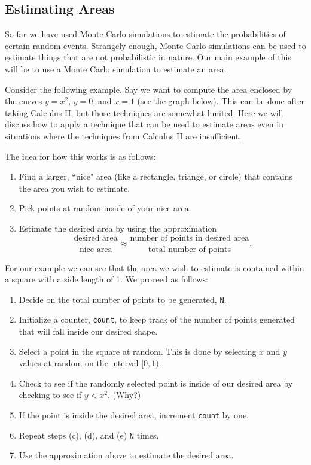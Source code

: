 \documentclass{ximera}
\begin{document}
\subsection{Estimating Areas}

So far we have used Monte Carlo simulations to estimate the probabilities of certain random events. Strangely enough, Monte Carlo simulations can be used to estimate things that are not probabilistic in nature. Our main example of this will be to use a Monte Carlo simulation to estimate an area.

Consider the following example. Say we want to compute the area enclosed by the curves $y = x^2$, $y=0$, and $x=1$ (see the graph below). This can be done after taking Calculus II, but those techniques are somewhat limited. Here we will discuss how to apply a technique that can be used to estimate areas even in situations where the techniques from Calculus II are insufficient.


The idea for how this works is as follows:

\begin{enumerate}
	\item Find a larger, ``nice" area (like a rectangle, triange, or circle) that contains the area you wish to estimate.
	\item Pick points at random inside of your nice area.
	\item Estimate the desired area by using the approximation $$\frac{\text{desired area}}{\text{nice area}}\approx\frac{\text{number of points in desired area}}{\text{total number of points}}.$$
\end{enumerate}

For our example we can see that the area we wish to estimate is contained within a square with a side length of 1. We proceed as follows:

\begin{enumerate}
	\item Decide on the total number of points to be generated, \verb|N|.
	\item Initialize a counter, \verb|count|, to keep track of the number of points generated that will fall inside our desired shape.
	\item Select a point in the square at random. This is done by selecting $x$ and $y$ values at random on the interval $[0,1)$.
	\item Check to see if the randomly selected point is inside of our desired area by checking to see if $y<x^2$. (Why?)
	\item If the point is inside the desired area, increment \verb|count| by one.
	\item Repeat steps (c), (d), and (e) \verb|N| times.
	\item Use the approximation above to estimate the desired area.
\end{enumerate}
\end{document}
